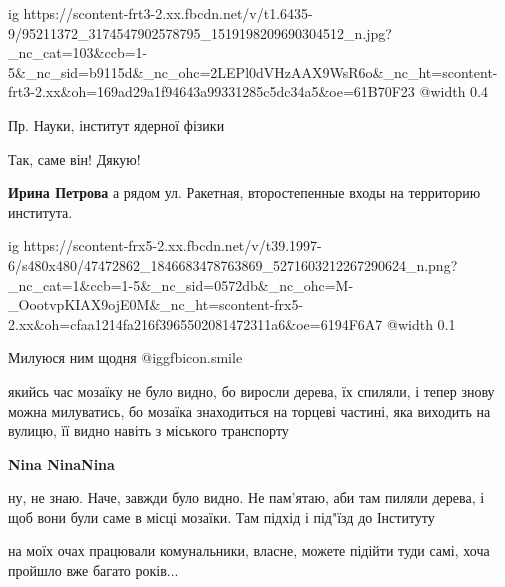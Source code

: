  
 
 
 
 

\ifcmt
  ig https://scontent-frt3-2.xx.fbcdn.net/v/t1.6435-9/95211372_3174547902578795_1519198209690304512_n.jpg?_nc_cat=103&ccb=1-5&_nc_sid=b9115d&_nc_ohc=2LEPl0dVHzAAX9WsR6o&_nc_ht=scontent-frt3-2.xx&oh=169ad29a1f94643a99331285c5dc34a5&oe=61B70F23
  @width 0.4
\fi

Пр. Науки, інститут ядерної фізики

Так, саме він! Дякую!

\textbf{Ирина Петрова} а рядом ул. Ракетная, второстепенные входы на территорию института.


\ifcmt
  ig https://scontent-frx5-2.xx.fbcdn.net/v/t39.1997-6/s480x480/47472862_1846683478763869_5271603212267290624_n.png?_nc_cat=1&ccb=1-5&_nc_sid=0572db&_nc_ohc=M-_OootvpKIAX9ojE0M&_nc_ht=scontent-frx5-2.xx&oh=cfaa1214fa216f3965502081472311a6&oe=6194F6A7
  @width 0.1
\fi

Милуюся ним щодня  @igg{fbicon.smile} 


якийсь час мозаїку не було видно, бо виросли дерева, їх спиляли, і тепер знову
можна милуватись, бо мозаїка знаходиться на торцеві частині, яка виходить на
вулицю, її видно навіть з міського транспорту

\textbf{Nina NinaNina} 

ну, не знаю. Наче, завжди було видно. Не пам'ятаю, аби там пиляли дерева, і щоб
вони були саме в місці мозаїки. Там підхід і під"їзд до Інституту


на моїх очах працювали комунальники, власне, можете підійти туди самі, хоча
пройшло вже багато років...

